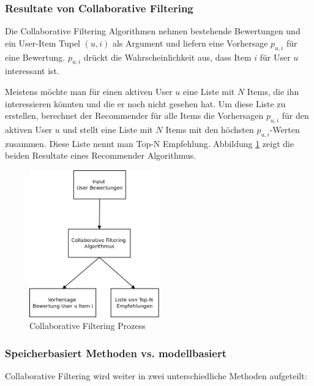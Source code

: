 \documentclass[a4paper, 12pt]{article}
\begin{document}
\subsubsection{Resultate von Collaborative Filtering}
\label{sec:output}

Die Collaborative Filtering Algorithmen nehmen bestehende Bewertungen und ein User-Item Tupel $(u,i)$ als Argument und liefern eine Vorhersage $p_{u,i}$ für eine Bewertung.  $p_{u,i}$ drückt die Wahrscheinlichkeit aus, dass Item $i$ für User $u$ interessant ist. 

Meistens möchte man für einen aktiven User $u$ eine Liste mit $N$ Items, die ihn interessieren könnten und die er noch nicht gesehen hat. Um diese Liste zu erstellen, berechnet der Recommender für alle Items die Vorhersagen $p_{u,i}$ für den aktiven User $u$ und stellt eine Liste mit $N$ Items mit den höchsten $p_{u,i}$-Werten zusammen. Diese Liste nennt man Top-N Empfehlung. Abbildung \ref{fig:cfprocess} zeigt die beiden Resultate eines Recommender Algorithmus.

\begin{figure}
  \centering
      \includegraphics[width=0.5\textwidth]{cf}
  \caption{Collaborative Filtering Prozess}
  \label{fig:cfprocess}
\end{figure}

\subsubsection{Speicherbasiert Methoden vs. modellbasiert}
\label{sec:cfmodels}

Collaborative Filtering wird weiter in zwei unterschiedliche Methoden aufgeteilt:
\end{document}
